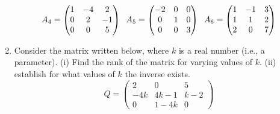 \documentclass[fleqn]{article}
\begin{document}
\begin{enumerate}
      $$A_4 = 
      \begin{pmatrix}
        1 & -4 & 2 \\
        0 & 2 & -1 \\
        0 & 0 & 5
      \end{pmatrix}\hskip 0.2truecm 
      A_5=\begin{pmatrix}
        -2 & 0 & 0 \\
        0 & 1 & 0 \\
        0 & 0 & 3
      \end{pmatrix}\hskip 0.2truecm
      A_6=\begin{pmatrix}
        1 & -1 & 3 \\
        1 & 1 & 2 \\
        2 & 0 & 7
      \end{pmatrix}
      $$
    
    
    \item  Consider the matrix written below, where $k$ is a real number (i.e., a parameter). (i) Find the rank of the matrix for varying values of $k$. (ii) establish for what values of $k$ the inverse exists. 
      $$
      Q = 
      \begin{pmatrix}
      2 & 0 & 5 \\
      -4k & 4k-1 & k-2 \\
      0 & 1-4k & 0
      \end{pmatrix}
      $$

  \end{enumerate}
\end{document}
